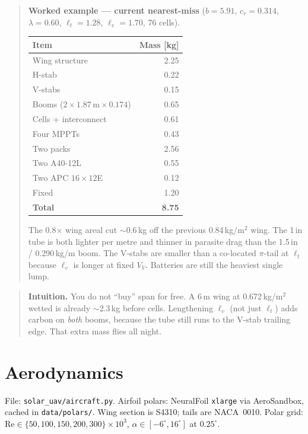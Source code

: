 \documentclass[11pt,letterpaper]{article}
\newcommand{\code}[1]{\texttt{#1}}
\newenvironment{intuition}{\begin{quote}\small}{\end{quote}}
\newenvironment{examplebox}{\begin{quote}\small}{\end{quote}}
\begin{document}
\begin{examplebox}
\textbf{Worked example --- current nearest-miss} ($b=5.91$, $c_r=0.314$, $\lambda=0.60$, $\ell_t=1.28$, $\ell_v=1.70$, 76 cells).

\begin{center}
\begin{tabular}{@{}lr@{}}
\toprule
Item & Mass [kg] \\
\midrule
Wing structure & 2.25 \\
H-stab & 0.22 \\
V-stabs & 0.15 \\
Booms ($2\times 1.87\,\mathrm{m}\times 0.174$) & 0.65 \\
Cells + interconnect & 0.61 \\
Four MPPTs & 0.43 \\
Two packs & 2.56 \\
Two A40-12L & 0.55 \\
Two APC $16\times12$E & 0.12 \\
Fixed & 1.20 \\
\midrule
\textbf{Total} & \textbf{8.75} \\
\bottomrule
\end{tabular}
\end{center}

The 0.8$\times$ wing areal cut $\sim$0.6\,kg off the previous 0.84\,kg/m$^2$ wing. The 1\,in tube is both lighter per metre and thinner in parasite drag than the 1.5\,in / 0.290\,kg/m boom. The V-stabs are smaller than a co-located $\pi$-tail at $\ell_t$ because $\ell_v$ is longer at fixed $V_V$. Batteries are still the heaviest single lump.
\end{examplebox}

\begin{intuition}
\textbf{Intuition.} You do not ``buy'' span for free. A 6\,m wing at 0.672\,kg/m$^2$ wetted is already $\sim$2.3\,kg before cells. Lengthening $\ell_v$ (not just $\ell_t$) adds carbon on \emph{both} booms, because the tube still runs to the V-stab trailing edge. That extra mass flies all night.
\end{intuition}

\section{Aerodynamics}

File: \code{solar\_uav/aircraft.py}. Airfoil polars: NeuralFoil \code{xlarge} via AeroSandbox, cached in \code{data/polars/}. Wing section is S4310; tails are NACA~0010. Polar grid: $\mathrm{Re} \in \{50,100,150,200,300\}\times 10^3$, $\alpha \in [-6^\circ, 16^\circ]$ at $0.25^\circ$.
\end{document}
